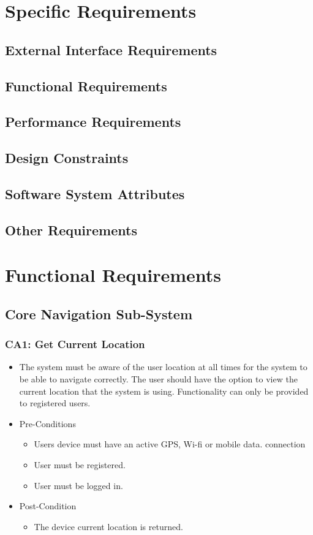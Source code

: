 \documentclass[12pt,a4paper]{article}
\begin{document}
\section{Specific Requirements}
	\subsection{External Interface Requirements}
	\subsection{Functional Requirements}
	\subsection{Performance Requirements}
	\subsection{Design Constraints}
	\subsection{Software System Attributes}
	\subsection{Other Requirements}
\section{Functional Requirements}
	\subsection{Core Navigation Sub-System}
		\subsubsection{CA1: Get Current Location}
			\begin{itemize}
				\item The system must be aware of the user location at all times for the system to be able to navigate correctly. The user should have the option to view the current location that the system is using. Functionality can only be provided to registered users.
				\item Pre-Conditions
					\begin{itemize}
						\item Users device must have an active GPS, Wi-fi or mobile data. connection
						\item User must be registered.
						\item User must be logged in.
					\end{itemize}
				\item Post-Condition
					\begin{itemize}
						\item The device current location is returned.
					\end{itemize}
			\end{itemize}
\end{document}
